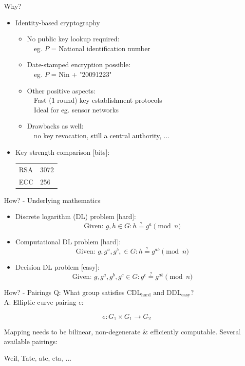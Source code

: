 \documentclass{beamer}
\begin{document}
\begin{frame}{Why?}
	\begin{itemize}
  		\item<1-> Identity-based cryptography\\
  			\begin{itemize}
				\item<1-> No public key lookup required:\\
					$\quad$eg. $P$ = National identification number
				\item<2-> Date-stamped encryption possible:\\
					$\quad$eg. $P$ = Nin + "20091223"
				\item<3-> Other positive aspects:\\
					$\quad$Fast (1 round) key establishment protocols\\
					$\quad$Ideal for eg. sensor networks
				\item<4-> Drawbacks as well:\\
					$\quad$no key revocation, still a central authority, $\ldots$
			\end{itemize}
		\item<5-> Key strength comparison [bits]:\\
			\begin{tabular}{ll}
				RSA			&	3072\\
				\alert{ECC}	&	\alert{256}\\
			\end{tabular}
	\end{itemize}
\end{frame}

\begin{frame}{How? - Underlying mathematics}
	\begin{itemize}
		\item<1-> Discrete logarithm (DL) problem [hard]:\\
				\[\text{Given: } g, h \in G \colon h \overset{?}{=} g^a \pmod n\]
		\item<2-> Computational DL problem [hard]:\\
				\[\text{Given: } g, g^a, g^b, \in G \colon h \overset{?}{=} g^{ab} \pmod n\]
		\item<3-> Decision DL problem [easy]:\\
				\[\text{Given: } g, g^a, g^b, g^c \in G \colon g^c \overset{?}{=} g^{ab} \pmod n \]
	\end{itemize}
\end{frame}

\begin{frame}{How? - Pairings}
	Q: What group satisfies CDL$_{\text{hard}}$ and DDL$_{\text{easy}}$?\\
	A: Elliptic curve pairing $e$:
	
	\[ e : G_1 \times G_1 \rightarrow G_2 \]
	
	Mapping needs to be bilinear, non-degenerate \& efficiently computable.
	Several available pairings:\\
	
	\begin{center}Weil, \alert{Tate}, ate, eta, $\ldots$\end{center}
\end{frame}
\end{document}
